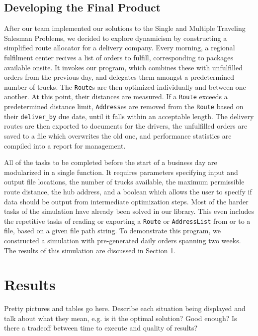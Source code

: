 \documentclass[letterpaper]{article}
\begin{document}
    \subsection{Developing the Final Product}
    \label{subsection:Developing_the_Final_Product}
    After our team implemented our solutions to the Single and Multiple Traveling Salesman Problems, we decided to explore dynamicism by constructing a simplified route allocator for a delivery company. Every morning, a regional fulfilment center recives a list of orders to fulfill, corresponding to packages available onsite. It invokes our program, which combines these with unfulfilled orders from the previous day, and delegates them amongst a predetermined number of trucks. The \verb|Route|s are then optimized individually and between one another. At this point, their distances are measured. If a \verb|Route| exceeds a predetermined distance limit, \verb|Address|es are removed from the \verb|Route| based on their \verb|deliver_by| due date, until it falls within an acceptable length. The delivery routes are then exported to documents for the drivers, the unfulfilled orders are saved to a file which overwrites the old one, and performance statistics are compiled into a report for management.

    All of the tasks to be completed before the start of a business day are modularized in a single function. It requires parameters specifying input and output file locations, the number of trucks available, the maximum permissible route distance, the hub address, and a boolean which allows the user to specify if data should be output from intermediate optimization steps. Most of the harder tasks of the simulation have already been solved in our library. This even includes the repetitive tasks of reading or exporting a \verb|Route| or \verb|AddressList| from or to a file, based on a given file path string. To demonstrate this program, we constructed a simulation with pre-generated daily orders spanning two weeks. The results of this simulation are discussed in Section \ref{section:Results}.

    \section{Results}
    \label{section:Results}
    Pretty pictures and tables go here. Describe each situation being displayed and talk about what they mean, e.g. is it the optimal solution? Good enough? Is there a tradeoff between time to execute and quality of results?
\end{document}
